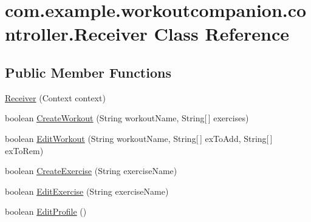 \hypertarget{classcom_1_1example_1_1workoutcompanion_1_1controller_1_1_receiver}{\section{com.\-example.\-workoutcompanion.\-controller.\-Receiver Class Reference}
\label{classcom_1_1example_1_1workoutcompanion_1_1controller_1_1_receiver}
}
\subsection*{Public Member Functions}
\begin{DoxyCompactItemize}
\item 
\hyperlink{classcom_1_1example_1_1workoutcompanion_1_1controller_1_1_receiver_acfb96b1541e3ba23321ed2d48cbbead1}{Receiver} (Context context)
\item 
boolean \hyperlink{classcom_1_1example_1_1workoutcompanion_1_1controller_1_1_receiver_a4dcbb836cd0af78eb9ff1960b06fffcb}{Create\-Workout} (String workout\-Name, String\mbox{[}$\,$\mbox{]} exercises)
\item 
boolean \hyperlink{classcom_1_1example_1_1workoutcompanion_1_1controller_1_1_receiver_a4a001b8158e4f00285c3a1c0302349f5}{Edit\-Workout} (String workout\-Name, String\mbox{[}$\,$\mbox{]} ex\-To\-Add, String\mbox{[}$\,$\mbox{]} ex\-To\-Rem)
\item 
boolean \hyperlink{classcom_1_1example_1_1workoutcompanion_1_1controller_1_1_receiver_a96eb1deda2a7bd7278c42df823a520f4}{Create\-Exercise} (String exercise\-Name)
\item 
boolean \hyperlink{classcom_1_1example_1_1workoutcompanion_1_1controller_1_1_receiver_af5807c400c5c805c8807d7bacd138c0b}{Edit\-Exercise} (String exercise\-Name)
\item 
boolean \hyperlink{classcom_1_1example_1_1workoutcompanion_1_1controller_1_1_receiver_a8cc04e91e624349f214b4550ab61ce56}{Edit\-Profile} ()
\end{DoxyCompactItemize}


